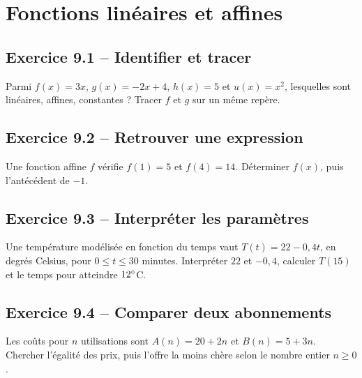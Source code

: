 \chapter{Fonctions linéaires et affines}
\label{exercices:09}
\section*{Exercice 9.1 -- Identifier et tracer}
Parmi $f(x)=3x$, $g(x)=-2x+4$, $h(x)=5$ et $u(x)=x^2$, lesquelles sont linéaires, affines, constantes ? Tracer $f$ et $g$ sur un même repère.

\section*{Exercice 9.2 -- Retrouver une expression}
Une fonction affine $f$ vérifie $f(1)=5$ et $f(4)=14$. Déterminer $f(x)$, puis l'antécédent de $-1$.

\section*{Exercice 9.3 -- Interpréter les paramètres}
Une température modélisée en fonction du temps vaut $T(t)=22-0{,}4t$, en degrés Celsius, pour $0\leq t\leq30$ minutes. Interpréter $22$ et $-0{,}4$, calculer $T(15)$ et le temps pour atteindre $12^{\circ}$C.

\section*{Exercice 9.4 -- Comparer deux abonnements}
Les coûts pour $n$ utilisations sont $A(n)=20+2n$ et $B(n)=5+3n$. Chercher l'égalité des prix, puis l'offre la moins chère selon le nombre entier $n\geq0$.
